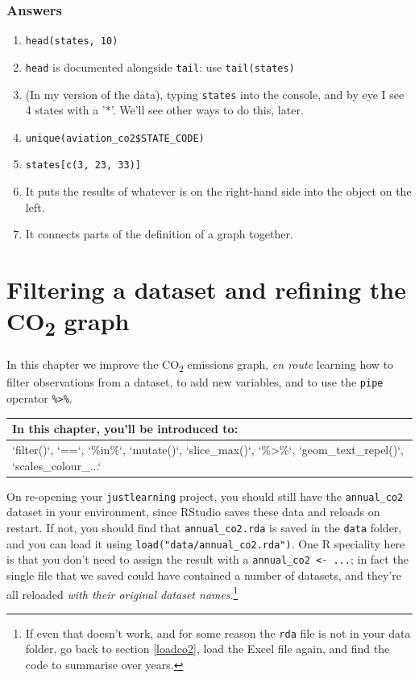 \documentclass[
]{book}
\providecommand{\tightlist}{%
  \setlength{\itemsep}{0pt}\setlength{\parskip}{0pt}}
\begin{document}
\hypertarget{answers-1}{%
\subsection{Answers}\label{answers-1}}

\begin{enumerate}
\def\labelenumi{\arabic{enumi})}
\tightlist
\item
  \texttt{head(states,\ 10)}
\item
  \texttt{head} is documented alongside \texttt{tail}: use \texttt{tail(states)}
\item
  (In my version of the data), typing \texttt{states} into the console, and by eye I see 4 states with a '*'. We'll see other ways to do this, later.
\item
  \texttt{unique(aviation\_co2\$STATE\_CODE)}
\item
  \texttt{states{[}c(3,\ 23,\ 33){]}}
\item
  It puts the results of whatever is on the right-hand side into the object on the left.
\item
  It connects parts of the definition of a graph together.
\end{enumerate}

\hypertarget{filter}{%
\chapter{\texorpdfstring{Filtering a dataset and refining the CO\textsubscript{2} graph}{Filtering a dataset and refining the CO2 graph}}\label{filter}}

In this chapter we improve the CO\textsubscript{2} emissions graph, \emph{en route} learning how to filter observations from a dataset, to add new variables, and to use the \texttt{pipe} operator \texttt{\%\textgreater{}\%}.

\begin{tabular}{l}
\hline
In this chapter, you'll be introduced to:\\
\hline
`filter()`, `==`, `\%in\%`, `mutate()`, `slice\_max()`, `\%>\%`, `geom\_text\_repel()`, `scales\_colour\_...`\\
\hline
\end{tabular}

On re-opening your \texttt{justlearning} project, you should still have the \texttt{annual\_co2} dataset in your environment, since RStudio saves these data and reloads on restart. If not, you should find that \texttt{annual\_co2.rda} is saved in the \texttt{data} folder, and you can load it using \texttt{load("data/annual\_co2.rda")}. One R speciality here is that you don't need to assign the result with a \texttt{annual\_co2\ \textless{}-\ ...}; in fact the single file that we saved could have contained a number of datasets, and they're all reloaded \emph{with their original dataset names}.\footnote{If even that doesn't work, and for some reason the \texttt{rda} file is not in your data folder, go back to section \ref{loadco2}, load the Excel file again, and find the code to summarise over years.}
\end{document}
